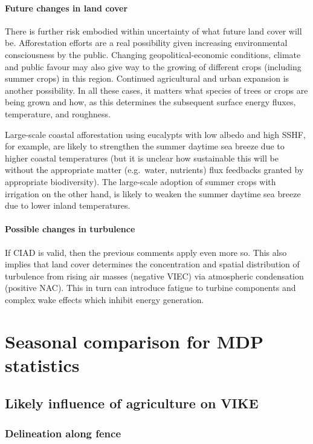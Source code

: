 \paragraph{Future changes in land cover}

There is further risk embodied within uncertainty of what future land cover will be. Afforestation efforts are a real possibility given increasing environmental consciousness by the public. Changing geopolitical-economic conditions, climate and public favour may also give way to the growing of different crops (including summer crops) in this region. Continued agricultural and urban expansion is another possibility. In all these cases, it matters what species of trees or crops are being grown and how, as this determines the subsequent surface energy fluxes, temperature, and roughness.

Large-scale coastal afforestation using eucalypts with low albedo and high \ac{SSHF}, for example, are likely to strengthen the summer daytime sea breeze due to higher coastal temperatures (but it is unclear how sustainable this will be without the appropriate matter (e.g.\ water, nutrients) flux feedbacks granted by appropriate biodiversity). The large-scale adoption of summer crops with irrigation on the other hand, is likely to weaken the summer daytime sea breeze due to lower inland temperatures.

\paragraph{Possible changes in turbulence}

If \ac{CIAD} is valid, then the previous comments apply even more so. This also implies that land cover determines the concentration and spatial distribution of turbulence from rising air masses (negative \ac{VIEC}) via atmospheric condensation (positive \ac{NAC}). This in turn can introduce fatigue to turbine components and complex wake effects which inhibit energy generation.

\section{Seasonal comparison for MDP statistics}

\subsection{Likely influence of agriculture on VIKE}

\subsubsection{Delineation along fence}

